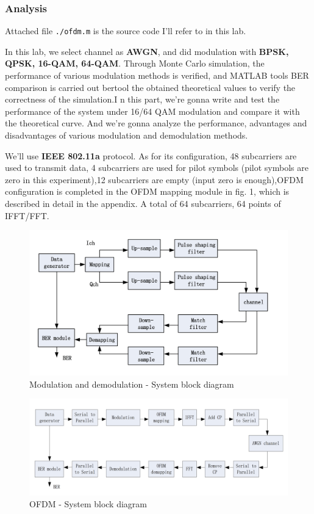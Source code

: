 \documentclass{article}
\begin{document}
\subsubsection{Analysis}


Attached file \lstinline|./ofdm.m| is the source code I'll refer to in this lab.

In this lab, we select channel as \textbf{AWGN}, and did modulation with \textbf{BPSK, QPSK, 16-QAM, 64-QAM}. Through Monte Carlo simulation, the performance of various modulation methods is verified, and MATLAB tools BER comparison is carried out bertool the obtained theoretical values to verify the correctness of the simulation.I n this part, we're gonna write and test the performance of the system under 16/64 QAM modulation and compare it with the theoretical curve. And we're gonna analyze the performance, advantages and disadvantages of various modulation and demodulation methods.

We'll use \textbf{IEEE 802.11a} protocol. As for its configuration, 48 subcarriers are used to transmit data, 4 subcarriers are used for pilot symbols (pilot symbols are zero in this experiment),12 subcarriers are empty (input zero is enough),OFDM configuration is completed in the OFDM mapping module in fig. 1, which is described in detail in the appendix. A total of 64 subcarriers, 64 points of IFFT/FFT.

\begin{figure}[!h]
	\centering
	\includegraphics[width=0.7\linewidth]{1}
	\caption{Modulation and demodulation -  System block diagram}
	\label{fig:1}
\end{figure}
\begin{figure}[!h]
	\centering
	\includegraphics[width=0.7\linewidth]{2}
	\caption{OFDM - System block diagram}
	\label{fig:2}
\end{figure}
\end{document}
